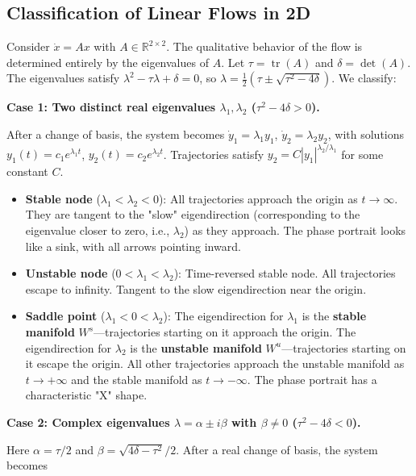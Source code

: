 \subsection{Classification of Linear Flows in 2D}\label{sec:3.3.3}

Consider $\dot{x} = Ax$ with $A \in \mathbb{R}^{2 \times 2}$. The qualitative behavior of the flow is determined entirely by the eigenvalues of $A$. Let $\tau = \operatorname{tr}(A)$ and $\delta = \det(A)$. The eigenvalues satisfy $\lambda^2 - \tau\lambda + \delta = 0$, so $\lambda = \frac{1}{2}(\tau \pm \sqrt{\tau^2 - 4\delta})$. We classify:

\textbf{Case 1: Two distinct real eigenvalues $\lambda_1, \lambda_2$ ($\tau^2 - 4\delta > 0$).}

After a change of basis, the system becomes $\dot{y}_1 = \lambda_1 y_1$, $\dot{y}_2 = \lambda_2 y_2$, with solutions $y_1(t) = c_1 e^{\lambda_1 t}$, $y_2(t) = c_2 e^{\lambda_2 t}$. Trajectories satisfy $y_2 = C |y_1|^{\lambda_2/\lambda_1}$ for some constant $C$.

\begin{itemize}[nosep]
  \item \textbf{Stable node} ($\lambda_1 < \lambda_2 < 0$): All trajectories approach the origin as $t \to \infty$. They are tangent to the "slow" eigendirection (corresponding to the eigenvalue closer to zero, i.e., $\lambda_2$) as they approach. The phase portrait looks like a sink, with all arrows pointing inward.

  \item \textbf{Unstable node} ($0 < \lambda_1 < \lambda_2$): Time-reversed stable node. All trajectories escape to infinity. Tangent to the slow eigendirection near the origin.

  \item \textbf{Saddle point} ($\lambda_1 < 0 < \lambda_2$): The eigendirection for $\lambda_1$ is the \textbf{stable manifold} $W^s$---trajectories starting on it approach the origin. The eigendirection for $\lambda_2$ is the \textbf{unstable manifold} $W^u$---trajectories starting on it escape the origin. All other trajectories approach the unstable manifold as $t \to +\infty$ and the stable manifold as $t \to -\infty$. The phase portrait has a characteristic "X" shape.
\end{itemize}

\textbf{Case 2: Complex eigenvalues $\lambda = \alpha \pm i\beta$ with $\beta \neq 0$ ($\tau^2 - 4\delta < 0$).}

Here $\alpha = \tau/2$ and $\beta = \sqrt{4\delta - \tau^2}/2$. After a real change of basis, the system becomes


